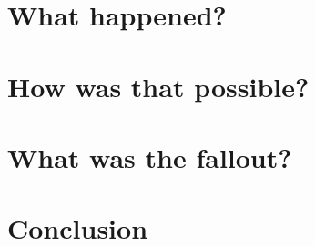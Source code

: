 \documentclass[a4paper, 11pt]{scrartcl}
\begin{document}
\section{What happened?}

\section{How was that possible?}

\section{What was the fallout?}

\section{Conclusion}

\nocite{*}
\clearpage
\printbibliography[heading=bibintoc]
\end{document}
